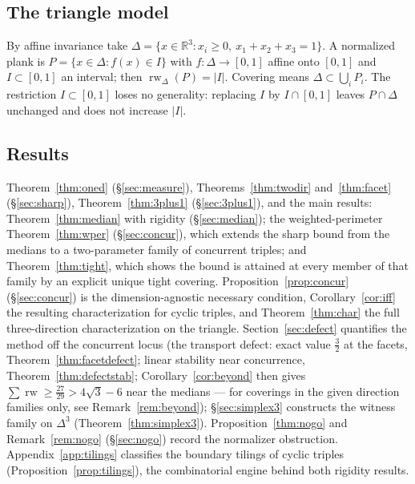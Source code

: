 \documentclass[11pt,reqno]{amsart}
\theoremstyle{plain}
\theoremstyle{definition}
\theoremstyle{remark}
\newcommand{\rw}{\operatorname{rw}}
\newcommand{\R}{\mathbb{R}}
\begin{document}
\subsection*{The triangle model}
By affine invariance take $\Delta=\{x\in\R^3:x_i\ge0,\ x_1+x_2+x_3=1\}$. A
normalized plank is $P=\{x\in\Delta: f(x)\in I\}$ with $f:\Delta\to[0,1]$ affine
onto $[0,1]$ and $I\subset[0,1]$ an interval; then $\rw_\Delta(P)=|I|$. Covering
means $\Delta\subset\bigcup_i P_i$. The restriction $I\subset[0,1]$ loses no
generality: replacing $I$ by $I\cap[0,1]$ leaves $P\cap\Delta$ unchanged and does
not increase $|I|$.

\subsection*{Results}
Theorem~\ref{thm:oned} (\S\ref{sec:measure}), Theorems~\ref{thm:twodir}
and~\ref{thm:facet} (\S\ref{sec:sharp}), Theorem~\ref{thm:3plus1}
(\S\ref{sec:3plus1}), and the main results: Theorem~\ref{thm:median} with rigidity
(\S\ref{sec:median}); the weighted-perimeter Theorem~\ref{thm:wper}
(\S\ref{sec:concur}), which extends the sharp bound from the medians to a
two-parameter family of concurrent triples; and
Theorem~\ref{thm:tight}, which shows the bound is attained at every member of
that family by an explicit unique tight covering.
Proposition~\ref{prop:concur} (\S\ref{sec:concur}) is the dimension-agnostic
necessary condition, Corollary~\ref{cor:iff} the resulting characterization for
cyclic triples, and Theorem~\ref{thm:char} the full three-direction
characterization on the triangle. Section~\ref{sec:defect} quantifies the
method off the concurrent locus (the transport defect: exact value $\tfrac32$
at the facets, Theorem~\ref{thm:facetdefect}; linear stability near
concurrence, Theorem~\ref{thm:defectstab}; Corollary~\ref{cor:beyond} then
gives $\sum\rw\ge\tfrac{27}{29}>4\sqrt3-6$ near the medians --- for coverings
in the given direction families only, see Remark~\ref{rem:beyond});
\S\ref{sec:simplex3} constructs the witness family
on $\Delta^3$ (Theorem~\ref{thm:simplex3}). Proposition~\ref{thm:nogo} and
Remark~\ref{rem:nogo} (\S\ref{sec:nogo})
record the normalizer obstruction. Appendix~\ref{app:tilings} classifies the
boundary tilings of cyclic triples (Proposition~\ref{prop:tilings}), the
combinatorial engine behind both rigidity results.
\end{document}
